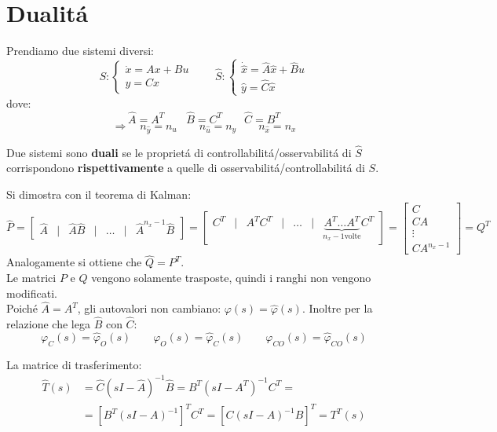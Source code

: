 \documentclass[../main.tex]{subfiles}
\begin{document}
	\section{Dualit\'a}
		Prendiamo due sistemi diversi:
		\[
			S:
			\begin{cases}
				\dot x = Ax + Bu\\
				y = Cx
			\end{cases}
			\qquad
			\hat S:
			\begin{cases}
				\dot{\hat x} = \hat A \hat x + \hat B \hat u\\
				\hat y = \hat C \hat x
			\end{cases}
		\]
		dove:
		\[
			\hat A = A^T \qquad \hat B = C^T \qquad \hat C = B^T
		\]
		\[
			\Rightarrow\quad n_{\hat y} = n_u \qquad n_{\hat u} = n_y \qquad n_{\hat x} = n_x
		\]
		
		Due sistemi sono \textbf{duali} se le propriet\'a di controllabilit\'a/osservabilit\'a di $ \hat S $ corrispondono \textbf{rispettivamente} a quelle di osservabilit\'a/controllabilit\'a di $ S $.
		
		Si dimostra con il teorema di Kalman:
		\[
			\hat P =
			\begin{bmatrix}
				\hat A & | & \hat A \hat B & | & \dots & | & \hat{A}^{n_x-1} \hat B
			\end{bmatrix} =
			\begin{bmatrix}
				C^T &|& A^T C^T &|& \dots &|& \underbrace{A^T \dots A^T}_{n_x-1 \text{volte}} C^T
			\end{bmatrix} =
			\begin{bmatrix}
				C\\
				CA\\
				\vdots\\
				CA^{n_x-1}
			\end{bmatrix} = Q^T
		\]
		Analogamente si ottiene che $ \hat Q = P^T $.\\
		\newline
		Le matrici $ P $ e $ Q $ vengono solamente trasposte, quindi i ranghi non vengono modificati.\\
		Poich\'e $ \hat A = A^T $, gli autovalori non cambiano: $ \varphi(s) = \hat \varphi(s) $. Inoltre per la relazione che lega $ \hat B $ con $ \hat C $:
		\[
			\varphi_C(s) = \hat \varphi_O(s) \qquad \varphi_O(s) = \hat \varphi_C(s) \qquad \varphi_{CO}(s) = \hat \varphi_{CO}(s)
		\]
		
		La matrice di trasferimento:
		\begin{align*}
			\hat T(s) &= \hat C(sI-\hat A)^{-1} \hat B = B^T (sI-A^T)^{-1} C^T =\\
			&= \left[ B^T (sI-A)^{-1} \right]^{T} C^T = \left[ C(sI-A)^{-1} B \right]^T = T^T(s) 
		\end{align*}
\end{document}
